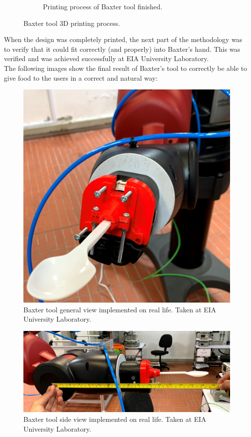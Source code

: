 \documentclass[11pt]{report} %
\begin{document}
\begin{figure}[H]
\begin{subfigure}{.5\textwidth}
		\caption{Printing process of Baxter tool finished.}
		\label{fig_3d_prniter_in_action_2}
	\end{subfigure}%
	\caption{Baxter tool 3D printing process.}
	\label{fig_baxter_tool_printing_process}
\end{figure}


When the design was completely printed, the next part of the methodology was to verify that it could fit correctly (and properly) into Baxter's hand. This was verified and was achieved successfully at EIA University Laboratory.\\

The following images show the final result of Baxter's tool to correctly be able to give food to the users in a correct and natural way:

\begin{figure}[H]
    \centering
    \includegraphics[width=0.6\linewidth]{assets/imgs/baxter_robot/baxter_tool_real_life_implementation.jpg}
    \caption{Baxter tool general view implemented on real life. Taken at EIA University Laboratory.} 
    \label{fig_baxter_tool_real_life_general_view}
\end{figure}

\begin{figure}[H]
    \centering
    \includegraphics[width=0.8\linewidth]{assets/imgs/baxter_robot/baxter_tool_real_life_implementation_side_view.jpg}
    \caption{Baxter tool side view implemented on real life. Taken at EIA University Laboratory.} 
    \label{fig_baxter_tool_real_life_side_view}
\end{figure}
\end{document}
